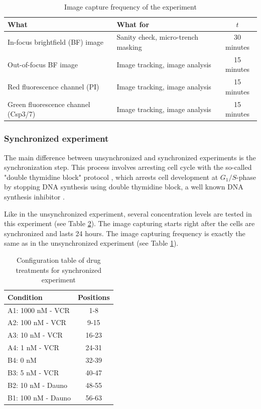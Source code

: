 \documentclass[pdftex,12pt,a4paper]{report}
\begin{document}
\begin{table}[H]
\centering
\begin{tabular}{| l | l | c |}
\hline
What & What for & $t$ \\
\hline
In-focus brightfield (BF) image & Sanity check, micro-trench masking & 30 minutes \\
Out-of-focus BF image & Image tracking, image analysis & 15 minutes \\
Red fluorescence channel (PI)& Image tracking, image analysis & 15 minutes \\
Green fluorescence channel (Csp3/7) & Image tracking, image analysis & 15 minutes \\
\hline
\end{tabular}
\caption{Image capture frequency of the experiment}
\label{table:image_capture_frequency}
\end{table}


\subsubsection{Synchronized experiment}

The main difference between unsynchronized and synchronized experiments is the synchronization step. This process involves arresting cell cycle with the so-called "double thymidine block" protocol \cite{harper2005synchronization}, which arrests cell development at $G_1/S$-phase by stopping DNA synthesis using double thymidine block, a well known DNA synthesis inhibitor \cite{bostock1971evaluation}.

Like in the unsynchronized experiment, several concentration levels are tested in this experiment (see Table \ref{table:syn_treatments}). The image capturing starts right after the cells are synchronized and lasts 24 hours. The image capturing frequency is exactly the same as in the unsynchronized experiment (see Table \ref{table:image_capture_frequency}).

\begin{table}[H]
\centering
\begin{tabular}{| l | c |}
\hline
Condition & Positions \\
\hline
A1: 1000 nM - VCR & 1-8 \\
A2: 100 nM - VCR & 9-15 \\
A3: 10 nM - VCR & 16-23 \\
A4: 1 nM - VCR & 24-31 \\
B4: 0 nM & 32-39 \\
B3: 5 nM - VCR & 40-47 \\
B2: 10 nM - Dauno & 48-55 \\
B1: 100 nM - Dauno & 56-63 \\
\hline
\end{tabular}
\caption{Configuration table of drug treatments for synchronized experiment}
\label{table:syn_treatments}
\end{table}
\end{document}
